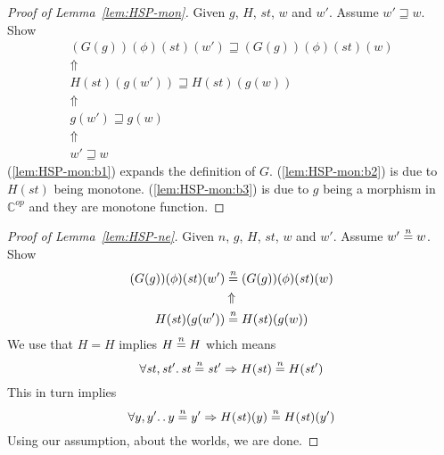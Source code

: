 \documentclass{article}
\newcommand{\nequal}[1][n]{\stackrel{\tiny{#1}}{=}}
\newcommand{\CatC}{\mathbb{C}}
\newcommand{\var}[1]{\mathit{#1}}
\newcommand{\future}{\mathbin{\sqsupseteq}}
\begin{document}
\begin{appendices}
\begin{proof}[Proof of Lemma~\ref{lem:HSP-mon}]
  Given $g$, $H$, $\var{st}$, $w$ and $w'$. Assume $w' \future w$. Show
  \begin{gather}
    (G(g))(\phi)(\var{st})(w') \future (G(g))(\phi)(\var{st})(w) \nonumber\\ 
    \Uparrow \label{lem:HSP-mon:b1}\\
    H(\var{st})(g(w')) \future H(\var{st})(g(w)) \nonumber \\
    \Uparrow \label{lem:HSP-mon:b2}\\
    g(w') \future g(w) \nonumber\\
    \Uparrow \label{lem:HSP-mon:b3}\\
    w' \future w \nonumber
  \end{gather}
(\ref{lem:HSP-mon:b1}) expands the definition of $G$. (\ref{lem:HSP-mon:b2}) is due to $H(\var{st})$ being monotone. (\ref{lem:HSP-mon:b3}) is due to $g$ being a morphism in $\CatC^{\var{op}}$ and they are monotone function.
\end{proof}

\begin{proof}[Proof of Lemma~\ref{lem:HSP-ne}]
  Given $n$, $g$, $H$, $\var{st}$, $w$ and $w'$. Assume $w' \nequal w$. Show
  \begin{gather}
    (G(g))(\phi)(\var{st})(w') \nequal (G(g))(\phi)(\var{st})(w) \nonumber\\ 
    \Uparrow \nonumber \\
    H(\var{st})(g(w')) \nequal H(\var{st})(g(w)) \nonumber \\
  \end{gather}
  We use that $H=H$ implies $H \nequal H$ which means
  \[
    \forall \var{st}, \var{st'} \ldotp \var{st} \nequal \var{st'} \Rightarrow H(\var{st}) \nequal H(\var{st'})
  \]
  This in turn implies
  \[
    \forall y,y' \ldotp \ldotp y \nequal y' \Rightarrow H(\var{st})(y) \nequal H(\var{st})(y')
  \]
  Using our assumption, about the worlds, we are done.
\end{proof}


\end{appendices}
\end{document}
